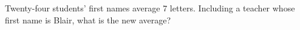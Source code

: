 Twenty-four students' first names average 7 letters. Including a teacher whose first name is Blair, what is the new average?
